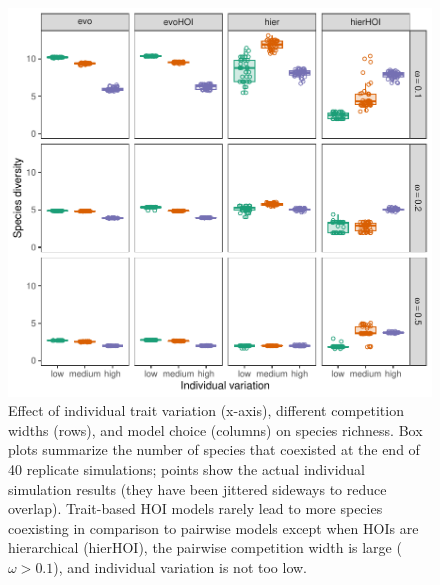 \documentclass[11pt]{article}
\begin{document}
\begin{figure}[p]
  \centering
  \includegraphics[width=\textwidth]{diversity.pdf}
  \caption{Effect of individual trait variation (x-axis), different competition widths (rows), and model choice (columns) on species richness. Box plots summarize the number of species that coexisted at the end of 40 replicate simulations; points show the actual individual simulation results (they have been jittered sideways to reduce overlap). Trait-based HOI models rarely lead to more species coexisting in comparison to pairwise models except when HOIs are hierarchical (hierHOI), the pairwise competition width is large ($\omega > 0.1$), and individual variation is not too low.}
  \label{fig:diversity}
\end{figure}
\end{document}
